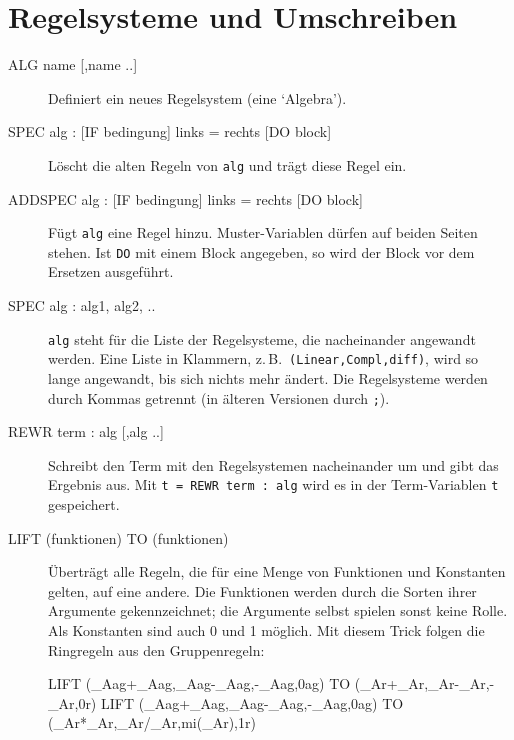 \documentclass[a4paper,11pt]{article}
\newcommand{\kw}[1]{\texttt{#1}}
\begin{document}
\section{Regelsysteme und Umschreiben}
\begin{description}
\item[ALG name {[},name ..{]}]
  Definiert ein neues Regelsystem (eine `Algebra').

\item[SPEC alg : {[}IF bedingung{]} links = rechts {[}DO block{]}]
  Löscht die alten Regeln von \kw{alg} und trägt diese Regel ein.

\item[ADDSPEC alg : {[}IF bedingung{]} links = rechts {[}DO block{]}]
  Fügt \kw{alg} eine Regel hinzu. Muster-Variablen dürfen auf beiden
  Seiten stehen. Ist \kw{DO} mit einem Block angegeben, so wird der Block
  vor dem Ersetzen ausgeführt.

\item[SPEC alg : alg1, alg2, ..]
  \kw{alg} steht für die Liste der Regelsysteme, die nacheinander
  angewandt werden. Eine Liste in Klammern, z.\,B.\
  \kw{(Linear,Compl,diff)}, wird so lange angewandt, bis sich nichts mehr
  ändert. Die Regelsysteme werden durch Kommas getrennt (in älteren
  Versionen durch \kw{;}).

\item[REWR term : alg {[},alg ..{]}]
  Schreibt den Term mit den Regelsystemen nacheinander um und gibt das
  Ergebnis aus. Mit \kw{t = REWR term : alg} wird es in der Term-Variablen
  \kw{t} gespeichert.

\item[LIFT (funktionen) TO (funktionen)]
  Überträgt alle Regeln, die für eine Menge von Funktionen und Konstanten
  gelten, auf eine andere. Die Funktionen werden durch die Sorten ihrer
  Argumente gekennzeichnet; die Argumente selbst spielen sonst keine Rolle.
  Als Konstanten sind auch 0 und 1 möglich. Mit diesem Trick folgen die
  Ringregeln aus den Gruppenregeln:
\begin{beispiel}
LIFT (_Aag+_Aag,_Aag-_Aag,-_Aag,0ag) TO (_Ar+_Ar,_Ar-_Ar,-_Ar,0r)
LIFT (_Aag+_Aag,_Aag-_Aag,-_Aag,0ag) TO (_Ar*_Ar,_Ar/_Ar,mi(_Ar),1r)
\end{beispiel}
\end{description}
\end{document}
